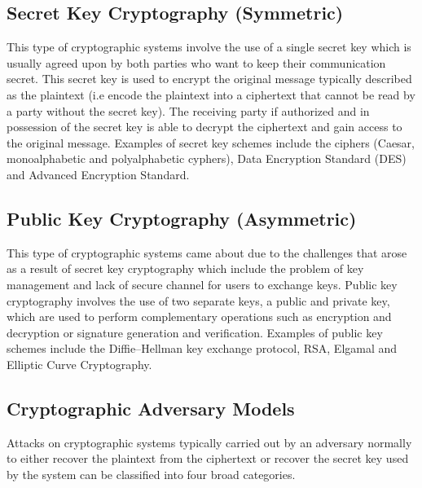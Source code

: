 \subsection*{Secret Key Cryptography (Symmetric)} This type of cryptographic systems involve the use of a single secret key which is usually agreed upon by both parties who want to keep their communication secret. This secret key is used to encrypt the original message typically described as the plaintext (i.e encode the plaintext into a ciphertext that cannot be read by a party without the secret key). The receiving party if authorized and in possession of the secret key is able to decrypt the ciphertext and gain access to the original message. Examples of secret key schemes include the ciphers (Caesar, monoalphabetic and polyalphabetic cyphers), Data Encryption Standard (DES) and Advanced Encryption Standard. 

\subsection*{Public Key Cryptography (Asymmetric)} This type of cryptographic systems came about due to the challenges that arose as a result of secret key cryptography which include the problem of key management and lack of secure channel for users to exchange keys. Public key cryptography involves the use of two separate keys, a public and private key, which are used to perform complementary operations such as encryption and decryption or signature generation and verification. Examples of public key schemes include the Diffie–Hellman key exchange protocol, RSA, Elgamal and Elliptic Curve Cryptography.

\subsection*{Cryptographic Adversary Models}

Attacks on cryptographic systems typically carried out by an adversary normally to either recover the plaintext from the ciphertext or recover the secret key used by the system can be classified into four broad categories.

